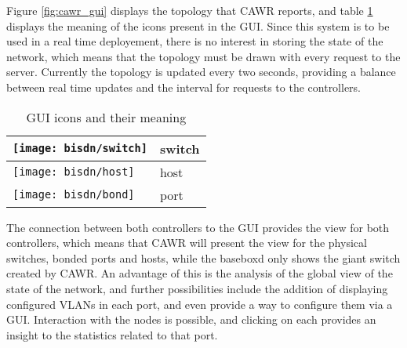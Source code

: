 \par Figure \ref{fig:cawr_gui} displays the topology that CAWR reports, and table \ref{tab:gui-mapping} displays the meaning of the icons present in the GUI. Since this system is to be used in a real time deployement, there is no interest in storing the 
state of the network, which means that the topology must be drawn with every request to the server. Currently the topology is updated every two seconds, providing a balance between real time updates and the interval for requests to the controllers.

\begin{table}[H]
    \centering
    \caption{GUI icons and their meaning}
    \label{tab:gui-mapping}
    \begin{tabular}{l | l}

        \centering
            \texttt{[image: bisdn/switch]}
        
        & switch     & \\ \hline 

            \texttt{[image: bisdn/host]}
        
        & host     & \\ \hline 
        
        \texttt{[image: bisdn/bond]}
        
        & port     & \\
   \end{tabular}
\end{table}

\par The connection between both controllers to the GUI provides the view for both controllers, which means that CAWR will present the view for the physical switches, bonded ports and hosts, while the baseboxd only shows the giant switch created by CAWR.
An advantage of this is the analysis of the global view of the state of the network, and further possibilities include the addition of displaying configured VLANs in each port, and even provide a way to configure them via a GUI. Interaction with the nodes is possible,
and clicking on each provides an insight to the statistics related to that port.  
